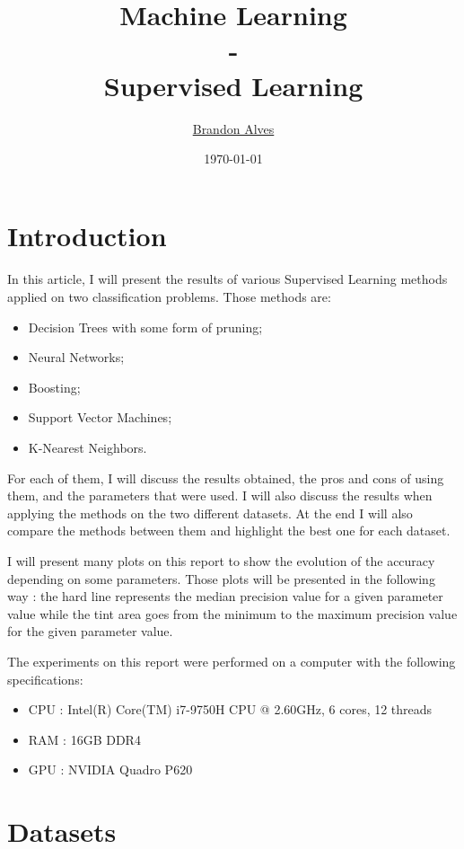 \documentclass[10pt]{article}
\title{
	Machine Learning
	\\-\\
	Supervised Learning
}
\author{
	\href{mailto:brandon.alves@gatech.edu}{Brandon Alves}
}
\date{\today}
\begin{document}
	\maketitle
	\thispagestyle{empty}
	\tableofcontents
	\listoffigures
	\clearpage
	\setcounter{page}{1}
	\section{Introduction}
		\paragraph*{}
			In this article, I will present the results of various Supervised Learning methods applied on two classification problems. Those methods are:
			\begin{itemize}
				\item Decision Trees with some form of pruning;
				\item Neural Networks;
				\item Boosting;
				\item Support Vector Machines;
				\item K-Nearest Neighbors.
			\end{itemize}
			For each of them, I will discuss the results obtained, the pros and cons of using them, and the parameters that were used. I will also discuss the results when applying the methods on the two different datasets. At the end I will also compare the methods between them and highlight the best one for each dataset.

			I will present many plots on this report to show the evolution of the accuracy depending on some parameters. Those plots will be presented in the following way : the hard line represents the median precision value for a given parameter value while the tint area goes from the minimum to the maximum precision value for the given parameter value.

			The experiments on this report were performed on a computer with the following specifications:
			\begin{itemize}
				\item CPU : Intel(R) Core(TM) i7-9750H CPU @ 2.60GHz, 6 cores, 12 threads
				\item RAM : 16GB DDR4
				\item GPU : NVIDIA Quadro P620
			\end{itemize}
	\section{Datasets}
\end{document}
